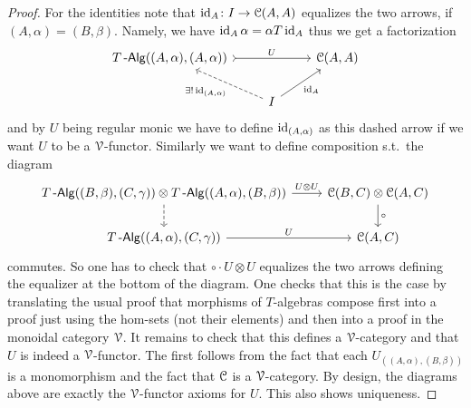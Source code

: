 \documentclass[a4paper,11pt,oneside,openany]{scrbook}
\begin{document}
\begin{proof}
For the identities note that $\operatorname{id}_A\colon I\to\operatorname{\mathcal{C}}(A,A)$ equalizes the two arrows, if $(A,\alpha)=(B,\beta)$. Namely, we have $\operatorname{id}_A\alpha=\alpha T\operatorname{id}_A$ thus we get a factorization
\[
\begin{tikzcd}
T\Alg((A,\alpha),(A,\alpha)) \arrow[rr, tail, "U"] & & \C(A,A)\\ 
&  I \ar[ul, dashed, "\exists!\id_{(A,\alpha)}"]\ar[ur, "\id_A"']
\end{tikzcd}
\]
and by $U$ being regular monic we have to define $\operatorname{id}_{(A,\alpha)}$ as this dashed arrow if we want $U$ to be a $\operatorname{\mathcal{V}}$-functor. Similarly we want to define composition s.t.\ the diagram
\[
 \begin{tikzcd}
        T\Alg((B,\beta),(C,\gamma))\otimes T\Alg((A,\alpha),(B,\beta))\ar[r, "U\otimes U"]\ar[d, dashed]
        & \C(B,C)\otimes\C(A,C)\ar[d, "\circ"] \\
         T\Alg((A,\alpha),(C,\gamma))\ar[r, "U"]
        & \C(A,C)
    \end{tikzcd}
    \]
commutes. So one has to check that $\circ\cdot U\otimes U$ equalizes the two arrows defining the equalizer at the bottom of the diagram. One checks that this is the case by translating the usual proof that morphisms of $T$-algebras compose first into a proof just using the hom-sets (not their elements) and then into a proof in the monoidal category $\operatorname{\mathcal{V}}$. It remains to check that this defines a $\operatorname{\mathcal{V}}$-category and that $U$ is indeed a $\operatorname{\mathcal{V}}$-functor. The first follows from the fact that each $U_{((A,\alpha),(B,\beta))}$ is a monomorphism and the fact that $\operatorname{\mathcal{C}}$ is a $\operatorname{\mathcal{V}}$-category. By design, the diagrams above are exactly the $\operatorname{\mathcal{V}}$-functor axioms for $U$. This also shows uniqueness.
\end{proof}
\end{document}

